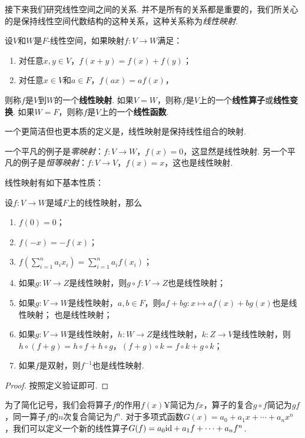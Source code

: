 接下来我们研究线性空间之间的关系. 并不是所有的关系都是重要的，我们所关心的是保持线性空间代数结构的这种关系，这种关系称为\emph{线性映射}. 

\begin{definition}
设$V$和$W$是$F$-线性空间，如果映射$f:V\to W$满足：
\begin{enumerate}
    \item 对任意$x,y\in V$，$f(x+y)=f(x)+f(y)$；
    \item 对任意$x\in V$和$a\in F$，$f(ax)=af(x)$，
\end{enumerate}
则称$f$是$V$到$W$的一个\textbf{线性映射}. 如果$V=W$，则称$f$是$V$上的一个\textbf{线性算子}或\textbf{线性变换}. 如果$W=F$，则称$f$是$V$上的一个\textbf{线性函数}.
\end{definition}
一个更简洁但也更本质的定义是，线性映射是保持线性组合的映射. 

一个平凡的例子是\emph{零映射}：$f:V\to W$，$f(x)=0$，这显然是线性映射. 另一个平凡的例子是\emph{恒等映射}：$f:V\to V$，$f(x)=x$，这也是线性映射. 

线性映射有如下基本性质：

\begin{proposition}\label{prop:linear-map-basic}
设$f:V\to W$是域$F$上的线性映射，那么
\begin{enumerate}
    \item $f(0)=0$；
    \item $f(-x)=-f(x)$；
    \item $f(\sum_{i=1}^n a_ix_i)=\sum_{i=1}^n a_if(x_i)$；
    \item 如果$g:W\to Z$是线性映射，则$g\circ f:V\to Z$也是线性映射；
    \item 如果$g:V\to W$是线性映射，$a,b\in F$，则$af+bg:x\mapsto af(x)+bg(x)$也是线性映射；
    也是线性映射；
    \item 如果$g:V\to W$是线性映射，$h:W\to Z$是线性映射，$k:Z\to V$是线性映射，则$h\circ(f+g)=h\circ f+h\circ g$，$(f+g)\circ k = f\circ k+g\circ k$；
    \item 如果$f$是双射，则$f^{-1}$也是线性映射. 
\end{enumerate}
\end{proposition}
\begin{proof}
    按照定义验证即可. 
\end{proof}

为了简化记号，我们会将算子$f$的作用$f(x)¥$简记为$fx$，算子的复合$g\circ f$简记为$gf$，同一算子$f$的$n$次复合简记为$f^n$. 对于多项式函数$G(x)=a_0+a_1x+\cdots+a_nx^n$，我们可以定义一个新的线性算子$G(f)=a_0\mathrm{id}+a_1f+\cdots+a_nf^n$. 

